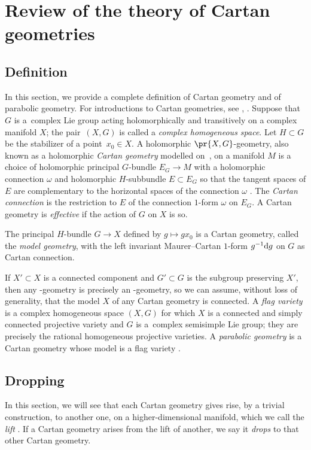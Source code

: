 \section{Review of the theory of Cartan geometries}\label{section:review}

\subsection{Definition}

In this section, we provide a complete definition of Cartan geometry and of parabolic geometry.
For introductions to Cartan geometries, see \cite[Chapter~1]{Cap/Slovak:2009}, \cite{mckay2023introduction,Sharpe:2002}.
Suppose that $G$ is a~complex Lie group acting holomorphically and transitively on a complex manifold $X$;
the pair~$(X, G)$ is called a \emph{complex homogeneous space}.
Let $H \subset G$ be the stabilizer of a point~$x_0 \in X$.
A holomorphic $\pr{X, G}$-geometry, also known as a holomorphic \emph{Cartan geometry} modelled on~, on a manifold $M$ is a
choice of holomorphic principal $G$-bundle $E_G \to M$ with a holomorphic connection
$\omega$ and holomorphic $H$-subbundle $E \subset E_G$ so that the tangent spaces of $E$ are complementary to the horizontal
spaces of the connection $\omega$ \cite{Sharpe:2002}.
The \emph{Cartan connection} is the restriction to $E$ of the connection $1$-form $\omega$ on $E_G$.
A Cartan geometry is \emph{effective} if the action of $G$ on $X$ is so.

The principal $H$-bundle $G \to X$ defined by $g \longmapsto gx_0$ is a Cartan geometry, called the \emph{model
geometry}, with the left invariant Maurer--Cartan $1$-form $g^{-1} {\rm d}g$ on $G$ as Cartan connection.

If $X' \subset X$ is a connected component and $G' \subset G$ is the subgroup preserving $X'$, then any -geometry
is precisely an -geometry, so we can assume, without loss of generality, that the model $X$ of any Cartan geometry is connected.
A \emph{flag variety} is a complex homogeneous space $(X, G)$ for which $X$ is a connected and simply connected projective variety
and $G$ is a~complex semisimple Lie group; they are precisely the rational homogeneous projective varieties.
A \emph{parabolic geometry} is a Cartan geometry whose model is a flag variety \cite{Cap/Slovak:2009}.

\subsection{Dropping}
In this section, we will see that each Cartan geometry gives rise, by a trivial construction, to another one, on a higher-dimensional manifold, which we call the \emph{lift} \cite[Section 9]{mckay2023introduction}.
If a Cartan geometry arises from the lift of another, we say it \emph{drops} to that other Cartan geometry.

